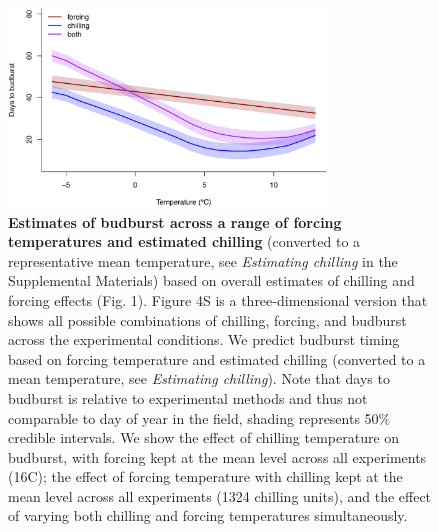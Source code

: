 \documentclass{article}
\begin{document}
\begin{figure}[h!]
\centering
\noindent \includegraphics[width=0.75\textwidth]{..//..//analyses/bb_analysis/figures/mupredictschill_utah_pep.png}
\caption{\textbf{Estimates of budburst across a range of forcing temperatures and estimated chilling} (converted to a representative mean temperature, see \emph{Estimating chilling} in the Supplemental Materials) based on overall estimates of chilling and forcing effects (Fig. 1). Figure 4S is a three-dimensional version that shows all possible combinations of chilling, forcing, and budburst across the experimental conditions. We predict budburst timing based on forcing temperature and estimated chilling (converted to a mean temperature, see \emph{Estimating chilling}). Note that days to budburst is relative to experimental methods and thus not comparable to day of year in the field, shading represents 50\% credible intervals. We show the effect of chilling temperature on budburst, with forcing kept at the mean level across all experiments (16\degree C);  the effect of forcing temperature with chilling kept at the mean level across all experiments (1324 chilling units), and  the effect of varying both chilling and forcing temperatures simultaneously.}
\label{fig:2dfieldchillutah}
\end{figure}
\end{document}
